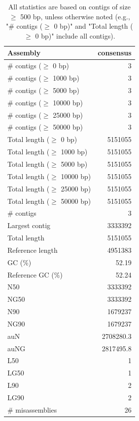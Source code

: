 \documentclass[12pt,a4paper]{article}
\begin{document}
\begin{table}[ht]
\begin{center}
\caption{All statistics are based on contigs of size $\geq$ 500 bp, unless otherwise noted (e.g., "\# contigs ($\geq$ 0 bp)" and "Total length ($\geq$ 0 bp)" include all contigs).}
\begin{tabular}{|l*{1}{|r}|}
\hline
Assembly & consensus \\ \hline
\# contigs ($\geq$ 0 bp) & 3 \\ \hline
\# contigs ($\geq$ 1000 bp) & 3 \\ \hline
\# contigs ($\geq$ 5000 bp) & 3 \\ \hline
\# contigs ($\geq$ 10000 bp) & 3 \\ \hline
\# contigs ($\geq$ 25000 bp) & 3 \\ \hline
\# contigs ($\geq$ 50000 bp) & 3 \\ \hline
Total length ($\geq$ 0 bp) & 5151055 \\ \hline
Total length ($\geq$ 1000 bp) & 5151055 \\ \hline
Total length ($\geq$ 5000 bp) & 5151055 \\ \hline
Total length ($\geq$ 10000 bp) & 5151055 \\ \hline
Total length ($\geq$ 25000 bp) & 5151055 \\ \hline
Total length ($\geq$ 50000 bp) & 5151055 \\ \hline
\# contigs & 3 \\ \hline
Largest contig & 3333392 \\ \hline
Total length & 5151055 \\ \hline
Reference length & 4951383 \\ \hline
GC (\%) & 52.19 \\ \hline
Reference GC (\%) & 52.24 \\ \hline
N50 & 3333392 \\ \hline
NG50 & 3333392 \\ \hline
N90 & 1679237 \\ \hline
NG90 & 1679237 \\ \hline
auN & 2708280.3 \\ \hline
auNG & 2817495.8 \\ \hline
L50 & 1 \\ \hline
LG50 & 1 \\ \hline
L90 & 2 \\ \hline
LG90 & 2 \\ \hline
\# misassemblies & 26 \\ \hline

\end{tabular}
\end{center}
\end{table}
\end{document}
